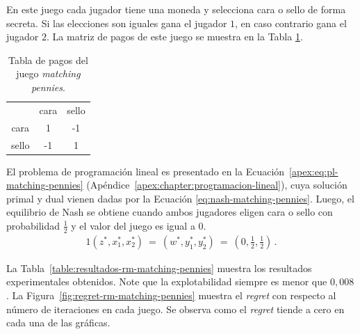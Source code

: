 En este juego cada jugador tiene una moneda y selecciona cara o sello de forma secreta. Si las elecciones son iguales gana el jugador $1$, en caso contrario gana el jugador $2$. La matriz de pagos de este juego se muestra en la Tabla \ref{table:pagos-matching-pennies}.
\begin{table}[h]
\begin{center}
\caption[Tabla de pagos del juego matching pennies]{Tabla de pagos del juego \textit{matching pennies}.}
\label{table:pagos-matching-pennies}
\begin{tabular}{ c | c | c |}
 \multicolumn{1}{c}{} & \multicolumn{1}{c}{cara} & \multicolumn{1}{c}{sello}  \\ \cline{2-3}
 cara  &  1 & -1 \\ \cline{2-3}
 sello & -1 &  1 \\ \cline{2-3}
\end{tabular}
\end{center}
\end{table}

El problema de programación lineal es presentado en la Ecuación~\ref{apex:eq:pl-matching-pennies} (Apéndice~\ref{apex:chapter:programacion-lineal}), cuya solución primal y dual vienen dadas por la Ecuación \ref{eq:nash-matching-pennies}. Luego, el equilibrio de Nash se obtiene cuando ambos jugadores eligen cara o sello con probabilidad $\frac{1}{2}$ y el valor del juego es igual a $0$.
\begin{alignat}{1}
\label{eq:nash-matching-pennies}
(z^*, x_1^*, x_2^*)\ =\ (w^*, y^*_1, y^*_2)\ =\ \left(0, \frac{1}{2}, \frac{1}{2} \right) \,.
\end{alignat}

La Tabla~\ref{table:resultados-rm-matching-pennies} muestra los resultados experimentales obtenidos. Note que la explotabilidad siempre es menor que $0,008$. La Figura~\ref{fig:regret-rm-matching-pennies} muestra el \textit{regret} con respecto al número de iteraciones en cada juego. Se observa como el \textit{regret} tiende a cero en cada una de las gráficas.
 
